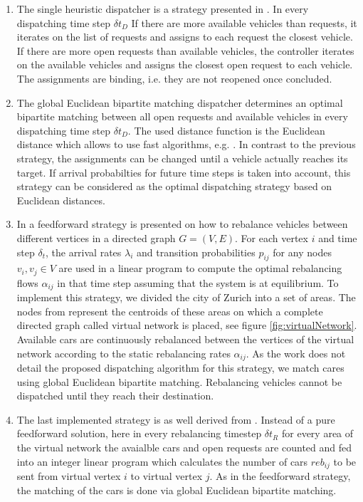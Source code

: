 \begin{enumerate}
\item The single heuristic dispatcher is a strategy presented in \cite{bischoff2016simulation}.
In every dispatching time step $\delta t_D$ If there are more available vehicles than requests,
it iterates on the list of requests and assigns to each request the closest vehicle. If there are
 more open requests than available vehicles, the controller iterates on the available vehicles and
 assigns the closest open request to each vehicle. The assignments are binding, i.e. they are not
 reopened once concluded.
\item The global Euclidean bipartite matching dispatcher determines an optimal bipartite matching
between all open requests and available vehicles in every dispatching time step $\delta t_D$.
The used distance function is the Euclidean distance which allows to use fast algorithms, e.g.
\cite{agarwal2004near}. In contrast to the previous strategy, the assignments can be changed
until a vehicle actually reaches its target. If arrival probabilties for future time steps is
taken into account, this strategy can be considered as the optimal dispatching strategy based
on Euclidean distances.
\item In \cite{pavone2011load} a feedforward strategy is presented on how to rebalance
vehicles between different vertices in a directed graph $G = (V,E)$. For each vertex $i$
and time step $\delta_t$, the arrival rates $\lambda_i$ and transition probabilities $p_{ij}$
for any nodes $v_i, v_j \in V$  are used in a linear program to compute the optimal
rebalancing flows $\alpha _{ij}$ in that time step assuming that the system is at equilibrium.
To implement this strategy, we divided the city of Zurich into a set of areas. The nodes
from \cite{pavone2011load} represent the centroids of these areas on which a complete directed
graph called virtual network is placed, see figure \ref{fig:virtualNetwork}. Available cars
are continuously rebalanced between the vertices of the virtual network according to the
static rebalancing rates $\alpha_{ij}$. As the work does not detail the proposed
dispatching algorithm for this strategy, we match cares using global Euclidean
bipartite matching. Rebalancing vehicles cannot be dispatched until they reach
their destination.
\item The last implemented strategy is as well derived from \cite{pavone2011load}.
Instead of a pure feedforward solution, here in every rebalancing timestep $\delta t_R$
for every area of the virtual network the avaialble cars and open requests are counted
and fed into an integer linear program which calculates the number of cars $reb _{ij}$
to be sent from virtual vertex $i$ to virtual vertex $j$. As in the feedforward
strategy, the matching of the cars is done via global Euclidean bipartite matching.
\end{enumerate}
